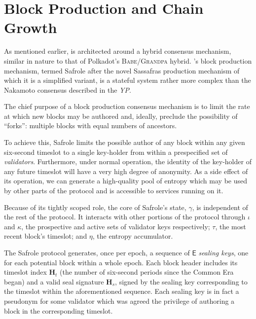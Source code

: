 \section{Block Production and Chain Growth}\label{sec:blockproduction}

As mentioned earlier, \Jam is architected around a hybrid consensus mechanism, similar in nature to that of Polkadot's \textsc{Babe}/\textsc{Grandpa} hybrid. \Jam's block production mechanism, termed Safrole after the novel Sassafras production mechanism of which it is a simplified variant, is a stateful system rather more complex than the Nakamoto consensus described in the \emph{YP}.

The chief purpose of a block production consensus mechanism is to limit the rate at which new blocks may be authored and, ideally, preclude the possibility of ``forks'': multiple blocks with equal numbers of ancestors.

To achieve this, Safrole limits the possible author of any block within any given six-second timeslot to a single key-holder from within a prespecified set of \emph{validators}. Furthermore, under normal operation, the identity of the key-holder of any future timeslot will have a very high degree of anonymity. As a side effect of its operation, we can generate a high-quality pool of entropy which may be used by other parts of the protocol and is accessible to services running on it.

Because of its tightly scoped role, the core of Safrole's state, $\gamma$, is independent of the rest of the protocol. It interacts with other portions of the protocol through $\iota$ and $\kappa$, the prospective and active sets of validator keys respectively; $\tau$, the most recent block's timeslot; and $\eta$, the entropy accumulator.


The Safrole protocol generates, once per epoch, a sequence of $\mathsf{E}$ \emph{sealing keys}, one for each potential block within a whole epoch. Each block header includes its timeslot index $\mathbf{H}_t$ (the number of six-second periods since the \Jam Common Era began) and a valid seal signature $\mathbf{H}_s$, signed by the sealing key corresponding to the timeslot within the aforementioned sequence. Each sealing key is in fact a pseudonym for some validator which was agreed the privilege of authoring a block in the corresponding timeslot.

